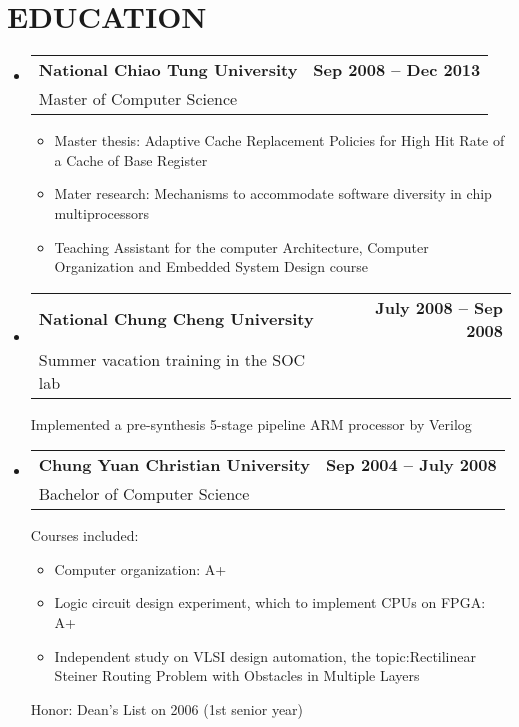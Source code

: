 \documentclass[letterpaper,11pt]{article}
\makeatletter
\newcommand{\resumeItem}[1]{
  \item\small{
    {#1 \vspace{-0.5pt}}
  }
}
\newcommand{\resumeSubheading}[3]{
  \vspace{-2pt}\item
    \begin{tabular*}{1.0\textwidth}[t]{l@{\extracolsep{\fill}}r}
      \textbf{\large#1} & \textbf{\small #2} \\
      {\large#3} \\
      
    \end{tabular*}\vspace{-5pt}
}
\newcommand{\resumeSubHeadingListStart}{\begin{itemize}[leftmargin=0.0in, label={}]}
\newcommand{\resumeSubHeadingListEnd}{\end{itemize}}
\newcommand{\resumeItemListStart}{\begin{itemize}}
\newcommand{\resumeItemListEnd}{\end{itemize}\vspace{-5pt}}
\makeatother
\begin{document}
\section{EDUCATION}
  \resumeSubHeadingListStart
    \resumeSubheading
      {National Chiao Tung University \href{https://www.nctu.edu.tw/en}{\raisebox{-0.1\height}\faExternalLink}}{Sep 2008 -- Dec 2013}
      {Master of Computer Science}
      \resumeItemListStart
        \resumeItem{Master thesis: Adaptive Cache Replacement Policies for High Hit Rate of a Cache of Base Register}
        \resumeItem{Mater research: Mechanisms to accommodate software diversity in chip multiprocessors}
        \resumeItem{Teaching Assistant for the computer Architecture, Computer Organization and Embedded System Design course}
      \resumeItemListEnd
  \resumeSubHeadingListEnd
  \vspace{-16pt}
  \resumeSubHeadingListStart
    \resumeSubheading
      {National Chung Cheng University \href{https://www.ccu.edu.tw/eng/index.php}{\raisebox{-0.1\height}\faExternalLink}}{July 2008 -- Sep 2008}
      {Summer vacation training in the SOC lab}
      
      Implemented a pre-synthesis 5-stage pipeline ARM processor by Verilog
  \resumeSubHeadingListEnd
  \vspace{-18pt}
  \resumeSubHeadingListStart
    \resumeSubheading
      {Chung Yuan Christian University \href{https://www.cycu.edu.tw/eng/}{\raisebox{-0.1\height}\faExternalLink}}{Sep 2004 -- July 2008}{Bachelor of Computer Science}
      
      Courses included:
      \vspace{-5pt}
      \resumeItemListStart
      \resumeItem{Computer organization: A+}
      \resumeItem{Logic circuit design experiment, which to implement CPUs on FPGA: A+}
      \resumeItem{Independent study on VLSI design automation, the topic:\newline Rectilinear Steiner Routing Problem with Obstacles in Multiple Layers}
      \resumeItemListEnd
      Honor: Dean's List on 2006 (1st senior year)
  \resumeSubHeadingListEnd
\vspace{-16pt}


\end{document}
